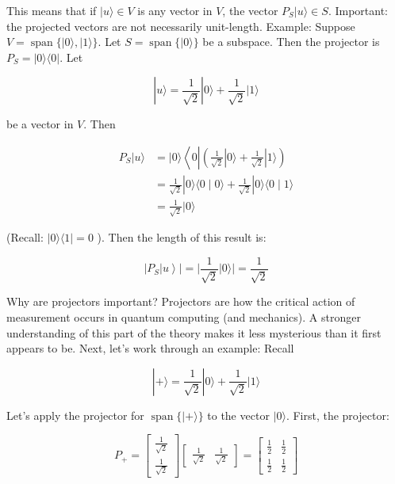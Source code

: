 \documentclass[main.tex]{subfiles}
\begin{document}
    This means that if $|u\rangle \in V$ is any vector in $V$, the vector $P_{S}|u\rangle \in S$. Important: the projected vectors are not necessarily unit-length. Example: Suppose $V=\operatorname{span}\{|0\rangle,|1\rangle\}$. Let $S=\operatorname{span}\{|0\rangle\}$ be a subspace. Then the projector is $P_{S}=|0\rangle\langle 0|$. Let
    
    $$
    |u\rangle=\frac{1}{\sqrt{2}}|0\rangle+\frac{1}{\sqrt{2}}|1\rangle
    $$
    
    be a vector in $V$. Then

    $$
    \begin{aligned}
    P_{S}|u\rangle &=|0\rangle\left\langle0 \left|\left(\frac{1}{\sqrt{2}}|0\rangle+\frac{1}{\sqrt{2}}|1\rangle\right)\right.\right.\\
    &=\frac{1}{\sqrt{2}}|0\rangle\langle 0 \mid 0\rangle+\frac{1}{\sqrt{2}}|0\rangle\langle 0 \mid 1\rangle \\
    &=\frac{1}{\sqrt{2}}|0\rangle
    \end{aligned} 
    $$

    (Recall: $|0\rangle\langle 1|=0$ ). Then the length of this result is:
    
    $$
    \left.\left|P_{S}\right| u\right\rangle|=| \frac{1}{\sqrt{2}}|0\rangle \mid=\frac{1}{\sqrt{2}}
    $$
    
    Why are projectors important? Projectors are how the critical action of measurement occurs in quantum computing (and mechanics). A stronger understanding of this part of the theory makes it less mysterious than it first appears to be. Next, let's work through an example: Recall
    
    $$
    |+\rangle=\frac{1}{\sqrt{2}}|0\rangle+\frac{1}{\sqrt{2}}|1\rangle
    $$
    
    Let's apply the projector for $\operatorname{span}\{|+\rangle\}$ to the vector $|0\rangle$. First, the projector:
    
    $$
    P_{+}=\left[\begin{array}{c}
    \frac{1}{\sqrt{2}} \\
    \frac{1}{\sqrt{2}}
    \end{array}\right]\left[\begin{array}{ll}
    \frac{1}{\sqrt{2}} & \frac{1}{\sqrt{2}}
    \end{array}\right]=\left[\begin{array}{cc}
    \frac{1}{2} & \frac{1}{2} \\
    \frac{1}{2} & \frac{1}{2}
    \end{array}\right]
    $$
    
\end{document}
